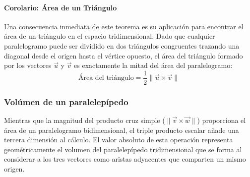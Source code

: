 \begin{center}
\shorthandoff{>}
\end{center}

\paragraph{Corolario: Área de un Triángulo}
Una consecuencia inmediata de este teorema es su aplicación para encontrar el área de un triángulo en el espacio tridimensional. Dado que cualquier paralelogramo puede ser dividido en dos triángulos congruentes trazando una diagonal desde el origen hasta el vértice opuesto, el área del triángulo formado por los vectores $\vec{u}$ y $\vec{v}$ es exactamente la mitad del área del paralelogramo:
\[ \text{Área del triángulo} = \frac{1}{2} \|\vec{u} \times \vec{v}\| \]

\subsubsection{Volúmen de un paralelepípedo}

Mientras que la magnitud del producto cruz simple ($\|\vec{v} \times \vec{w}\|$) proporciona el área de un paralelogramo bidimensional, el triple producto escalar añade una tercera dimensión al cálculo. El valor absoluto de esta operación representa geométricamente el volumen del paralelepípedo tridimensional que se forma al considerar a los tres vectores como aristas adyacentes que comparten un mismo origen.

